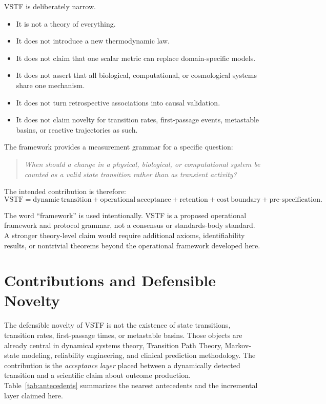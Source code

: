 \documentclass[11pt,a4paper]{article}
\newcommand{\VSTF}{\ensuremath{\mathrm{VSTF}}}
\newcommand{\1}{\mathbf{1}}
\begin{document}
VSTF is deliberately narrow.

\begin{itemize}
  \item It is not a theory of everything.
  \item It does not introduce a new thermodynamic law.
  \item It does not claim that one scalar metric can replace domain-specific models.
  \item It does not assert that all biological, computational, or cosmological systems share one mechanism.
  \item It does not turn retrospective associations into causal validation.
  \item It does not claim novelty for transition rates, first-passage events, metastable basins, or reactive trajectories as such.
\end{itemize}

The framework provides a measurement grammar for a specific question:

\begin{quote}
\emph{When should a change in a physical, biological, or computational system be counted as a valid state transition rather than as transient activity?}
\end{quote}

The intended contribution is therefore:
\[
  \VSTF =
  \mathrm{dynamic\ transition}
  + \mathrm{operational\ acceptance}
  + \mathrm{retention}
  + \mathrm{cost\ boundary}
  + \mathrm{pre\mbox{-}specification}.
\]

The word ``framework'' is used intentionally. VSTF is a proposed operational framework and protocol grammar, not a consensus or standards-body standard. A stronger theory-level claim would require additional axioms, identifiability results, or nontrivial theorems beyond the operational framework developed here.

\section{Contributions and Defensible Novelty}

The defensible novelty of VSTF is not the existence of state transitions, transition rates, first-passage times, or metastable basins. Those objects are already central in dynamical systems theory, Transition Path Theory, Markov-state modeling, reliability engineering, and clinical prediction methodology. The contribution is the \emph{acceptance layer} placed between a dynamically detected transition and a scientific claim about outcome production. Table~\ref{tab:antecedents} summarizes the nearest antecedents and the incremental layer claimed here.
\end{document}

